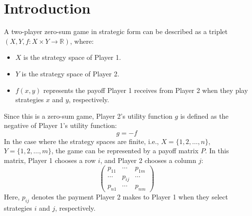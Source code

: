 \section{Introduction}

\begin{definition}
    A two-player zero-sum game in strategic form can be described as a triplet $(X, Y , f : X \times Y \rightarrow \mathbb{R})$, where:
\end{definition}
\begin{itemize}
    \item $X$ is the strategy space of Player 1.
    \item $Y$ is the strategy space of Player 2.
    \item $f(x, y)$ represents the payoff Player 1 receives from Player 2 when they play strategies $x$ and $y$, respectively.
\end{itemize}
Since this is a zero-sum game, Player 2's utility function $g$ is defined as the negative of Player 1's utility function:
\[g=-f\]
In the case where the strategy spaces are finite, i.e., $X = \{1, 2, \dots, n\}$, $Y = \{1, 2, \dots, m\}$, the game can be represented by a payoff matrix $P$. 
In this matrix, Player 1 chooses a row $i$, and Player 2 chooses a column $j$:
\[\begin{pmatrix} p_{11} & \cdots & p_{1m} \\ \cdots & p_{ij} & \cdots \\ p_{n1} & \cdots & p_{nm} \end{pmatrix}\]
Here, $p_{ij}$ denotes the payment Player 2 makes to Player 1 when they select strategies $i$ and $j$, respectively.

